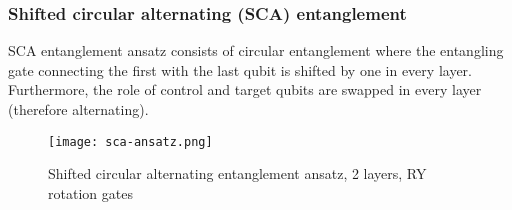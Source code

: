 \subsubsection{Shifted circular alternating (SCA) entanglement}
SCA entanglement ansatz consists of circular entanglement where the entangling gate connecting the first with the last qubit is shifted by one in every layer. Furthermore, the role of control and target qubits are swapped in every layer (therefore alternating).
\begin{figure}[H]
    \centering
    \texttt{[image: sca-ansatz.png]}
    \caption{Shifted circular alternating entanglement ansatz, 2 layers, RY rotation gates}
\end{figure}